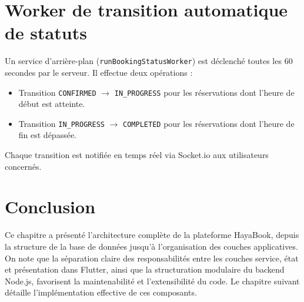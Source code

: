 \section{Worker de transition automatique de statuts}

Un service d'arrière-plan (\texttt{runBookingStatusWorker}) est déclenché toutes les 60 secondes par le serveur. Il effectue deux opérations :
\begin{itemize}
    \item Transition \texttt{CONFIRMED} $\rightarrow$ \texttt{IN\_PROGRESS} pour les réservations dont l'heure de début est atteinte.
    \item Transition \texttt{IN\_PROGRESS} $\rightarrow$ \texttt{COMPLETED} pour les réservations dont l'heure de fin est dépassée.
\end{itemize}
Chaque transition est notifiée en temps réel via Socket.io aux utilisateurs concernés.

\section{Conclusion}

Ce chapitre a présenté l'architecture complète de la plateforme HayaBook, depuis la structure de la base de données jusqu'à l'organisation des couches applicatives. On note que la séparation claire des responsabilités entre les couches service, état et présentation dans Flutter, ainsi que la structuration modulaire du backend Node.js, favorisent la maintenabilité et l'extensibilité du code. Le chapitre suivant détaille l'implémentation effective de ces composants.
